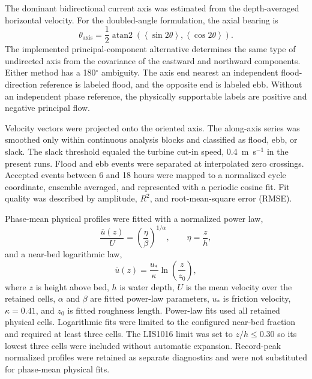 \documentclass[12pt,sort&compress]{elsarticle}
\begin{document}
The dominant bidirectional current axis was estimated from the depth-averaged horizontal velocity. For the doubled-angle formulation, the axial bearing is
\begin{equation}
\theta_{\mathrm{axis}}=\frac{1}{2}\operatorname{atan2}
\left(\left\langle\sin 2\theta\right\rangle,
\left\langle\cos 2\theta\right\rangle\right).
\label{eq:principal-axis}
\end{equation}
The implemented principal-component alternative determines the same type of undirected axis from the covariance of the eastward and northward components. Either method has a 180$^{\circ}$ ambiguity. The axis end nearest an independent flood-direction reference is labeled flood, and the opposite end is labeled ebb. Without an independent phase reference, the physically supportable labels are positive and negative principal flow.

Velocity vectors were projected onto the oriented axis. The along-axis series was smoothed only within continuous analysis blocks and classified as flood, ebb, or slack. The slack threshold equaled the turbine cut-in speed, 0.4~m~s$^{-1}$ in the present runs. Flood and ebb events were separated at interpolated zero crossings. Accepted events between 6 and 18 hours were mapped to a normalized cycle coordinate, ensemble averaged, and represented with a periodic cosine fit. Fit quality was described by amplitude, $R^2$, and root-mean-square error (RMSE).

Phase-mean physical profiles were fitted with a normalized power law,
\begin{equation}
\frac{\overline{u}(z)}{U}=\left(\frac{\eta}{\beta}\right)^{1/\alpha},
\qquad \eta=\frac{z}{h},
\label{eq:power-law}
\end{equation}
and a near-bed logarithmic law,
\begin{equation}
\overline{u}(z)=\frac{u_*}{\kappa}\ln\left(\frac{z}{z_0}\right),
\label{eq:log-law}
\end{equation}
where $z$ is height above bed, $h$ is water depth, $U$ is the mean velocity over the retained cells, $\alpha$ and $\beta$ are fitted power-law parameters, $u_*$ is friction velocity, $\kappa=0.41$, and $z_0$ is fitted roughness length. Power-law fits used all retained physical cells. Logarithmic fits were limited to the configured near-bed fraction and required at least three cells. The LIS1016 limit was set to $z/h\leq0.30$ so its lowest three cells were included without automatic expansion. Record-peak normalized profiles were retained as separate diagnostics and were not substituted for phase-mean physical fits.
\end{document}
